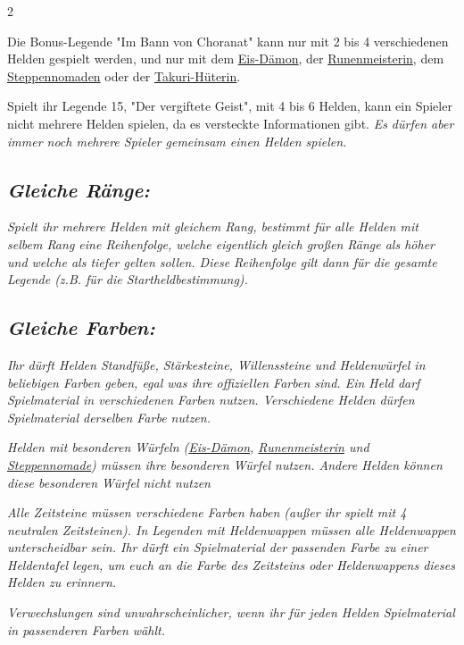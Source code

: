 \documentclass[10pt, a4paper, oneside]{book}
\newcommand{\fan}[1]{\textit{#1}}
\begin{document}
\begin{multicols*}{2}
\begin{nobgcolor}
\bullet{} Die Bonus-Legende "Im Bann von Choranat" kann nur mit 2 bis 4 verschiedenen Helden gespielt werden, und nur mit dem \hyperref[Eis-Dämon]{Eis-Dämon}, der \hyperref[Runenmeisterin]{Runenmeisterin}, dem \hyperref[Steppennomade]{Steppennomaden} oder der \hyperref[Takuri-Hüterin]{Takuri-Hüterin}.

\bullet{} Spielt ihr Legende 15, "Der vergiftete Geist", mit 4 bis 6 Helden, kann ein Spieler nicht mehrere Helden spielen, da es versteckte Informationen gibt. \fan{Es dürfen aber immer noch mehrere Spieler gemeinsam einen Helden spielen.}



\subsection{\fan{Gleiche Ränge:}}

\fan{Spielt ihr mehrere Helden mit gleichem Rang, bestimmt für alle Helden mit selbem Rang eine Reihenfolge, welche eigentlich gleich großen Ränge als höher und welche als tiefer gelten sollen. Diese Reihenfolge gilt dann für die gesamte Legende (z.B. für die Startheldbestimmung).}


\subsection{\fan{Gleiche Farben:}}

\fan{Ihr dürft Helden Standfüße, Stärkesteine, Willenssteine und Heldenwürfel in beliebigen Farben geben, egal was ihre offiziellen Farben sind. Ein Held darf Spielmaterial in verschiedenen Farben nutzen. Verschiedene Helden dürfen Spielmaterial derselben Farbe nutzen.} 

\fan{Helden mit besonderen Würfeln (\hyperref[Eis-Dämon]{Eis-Dämon},  \hyperref[Runenmeisterin]{Runenmeisterin} und \hyperref[Steppennomade]{Steppennomade}) müssen ihre besonderen Würfel nutzen. Andere Helden können diese besonderen Würfel nicht nutzen}

\fan{Alle Zeitsteine müssen verschiedene Farben haben (außer ihr spielt mit 4 neutralen Zeitsteinen). In Legenden mit Heldenwappen müssen alle Heldenwappen unterscheidbar sein. Ihr dürft ein Spielmaterial der passenden Farbe zu einer Heldentafel legen, um euch an die Farbe des Zeitsteins oder Heldenwappens dieses Helden zu erinnern.}


\fan{Verwechslungen sind unwahrscheinlicher, wenn ihr für jeden Helden Spielmaterial in passenderen Farben wählt.}





\end{nobgcolor}
\end{multicols*}
\end{document}

